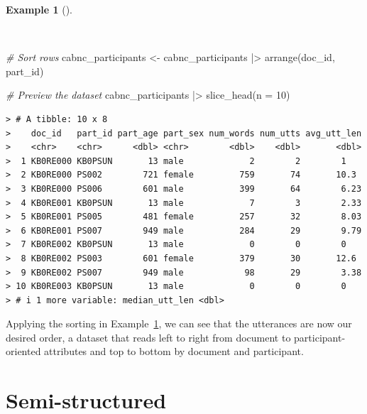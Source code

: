\documentclass[
  letterpaper,
  DIV=11,
  numbers=noendperiod]{scrreprt}
\newenvironment{Shaded}{\begin{snugshade}}{\end{snugshade}}
\newcommand{\AttributeTok}[1]{\textcolor[rgb]{0.00,0.00,0.00}{#1}}
\newcommand{\CommentTok}[1]{\textcolor[rgb]{0.00,0.00,0.00}{\textit{#1}}}
\newcommand{\DecValTok}[1]{\textcolor[rgb]{0.00,0.00,0.00}{#1}}
\newcommand{\FunctionTok}[1]{\textcolor[rgb]{0.00,0.00,0.00}{#1}}
\newcommand{\NormalTok}[1]{\textcolor[rgb]{0.00,0.00,0.00}{#1}}
\newcommand{\OtherTok}[1]{\textcolor[rgb]{0.00,0.00,0.00}{#1}}
\newcommand{\SpecialCharTok}[1]{\textcolor[rgb]{0.00,0.00,0.00}{#1}}
\theoremstyle{definition}
\newtheorem{example}{Example}[chapter]
\theoremstyle{remark}
\begin{document}
\begin{example}[]\protect\hypertarget{exm-cd-cabnc-sort-rows}{}\label{exm-cd-cabnc-sort-rows}

~

\begin{Shaded}
\begin{Highlighting}[]
\CommentTok{\# Sort rows}
\NormalTok{cabnc\_participants }\OtherTok{\textless{}{-}}
\NormalTok{  cabnc\_participants }\SpecialCharTok{|\textgreater{}}
  \FunctionTok{arrange}\NormalTok{(doc\_id, part\_id)}

\CommentTok{\# Preview the dataset}
\NormalTok{cabnc\_participants }\SpecialCharTok{|\textgreater{}}
  \FunctionTok{slice\_head}\NormalTok{(}\AttributeTok{n =} \DecValTok{10}\NormalTok{)}
\end{Highlighting}
\end{Shaded}

\begin{verbatim}
> # A tibble: 10 x 8
>    doc_id   part_id part_age part_sex num_words num_utts avg_utt_len
>    <chr>    <chr>      <dbl> <chr>        <dbl>    <dbl>       <dbl>
>  1 KB0RE000 KB0PSUN       13 male             2        2        1   
>  2 KB0RE000 PS002        721 female         759       74       10.3 
>  3 KB0RE000 PS006        601 male           399       64        6.23
>  4 KB0RE001 KB0PSUN       13 male             7        3        2.33
>  5 KB0RE001 PS005        481 female         257       32        8.03
>  6 KB0RE001 PS007        949 male           284       29        9.79
>  7 KB0RE002 KB0PSUN       13 male             0        0        0   
>  8 KB0RE002 PS003        601 female         379       30       12.6 
>  9 KB0RE002 PS007        949 male            98       29        3.38
> 10 KB0RE003 KB0PSUN       13 male             0        0        0   
> # i 1 more variable: median_utt_len <dbl>
\end{verbatim}

\end{example}

Applying the sorting in Example~\ref{exm-cd-cabnc-sort-rows}, we can see
that the utterances are now our desired order, a dataset that reads left
to right from document to participant-oriented attributes and top to
bottom by document and participant.

\section{Semi-structured}\label{semi-structured}
\end{document}
